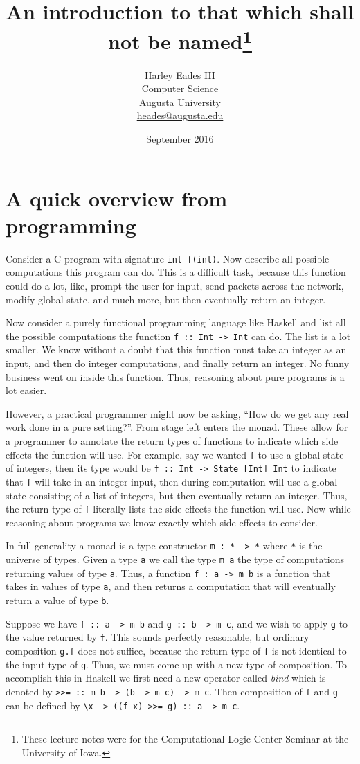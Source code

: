 \documentclass{article}
\title{An introduction to that which shall not be named\footnote{These lecture notes were for the Computational Logic Center Seminar at the University of Iowa.}}
\author{Harley Eades III\\Computer Science\\Augusta University\\\href{mailto:heades@augusta.edu}{heades@augusta.edu}}
\date{September 2016}
\begin{document}
\maketitle

\section{A quick overview from programming}
\label{sec:a_quick_example_from_programming}
Consider a C program with signature \verb!int f(int)!.  Now describe
all possible computations this program can do.  This is a difficult
task, because this function could do a lot, like, prompt the user for
input, send packets across the network, modify global state, and much
more, but then eventually return an integer.

Now consider a purely functional programming language like Haskell
\cite{Haskell} and list all the possible computations the function
\verb!f :: Int -> Int! can do. The list is a lot smaller.  We know
without a doubt that this function must take an integer as an input,
and then do integer computations, and finally return an integer.  No
funny business went on inside this function.  Thus, reasoning about
pure programs is a lot easier.

However, a practical programmer might now be asking, ``How do we get
any real work done in a pure setting?''.  From stage left enters the
monad.  These allow for a programmer to annotate the return types of
functions to indicate which side effects the function will use.  For
example, say we wanted \verb!f! to use a global state of integers,
then its type would be \verb!f :: Int -> State [Int] Int! to indicate
that \verb!f! will take in an integer input, then during computation
will use a global state consisting of a list of integers, but then
eventually return an integer.  Thus, the return type of \verb!f!
  literally lists the side effects the function will use.  Now while
  reasoning about programs we know exactly which side effects to
  consider.

In full generality a monad is a type constructor \verb!m : * -> *!
where \verb!*! is the universe of types.  Given a type \verb!a! we
call the type \verb!m a! the type of computations returning values
of type \verb!a!.  Thus, a function \verb!f : a -> m b! is a function that
takes in values of type \verb!a!, and then returns a computation that
will eventually return a value of type \verb!b!.

Suppose we have \verb!f :: a -> m b! and \verb!g :: b -> m c!, and we
wish to apply \verb!g! to the value returned by \verb!f!. This sounds
perfectly reasonable, but ordinary composition \verb!g.f! does not
suffice, because the return type of \verb!f! is not identical to the
input type of \verb!g!.  Thus, we must come up with a new type of
composition.  To accomplish this in Haskell we first need a new
operator called \textit{bind} which is denoted by
\verb!>>= :: m b -> (b -> m c) -> m c!.  Then composition of \verb!f!
and \verb!g! can be defined by
\verb!\x -> ((f x) >>= g) :: a -> m c!.
\end{document}

